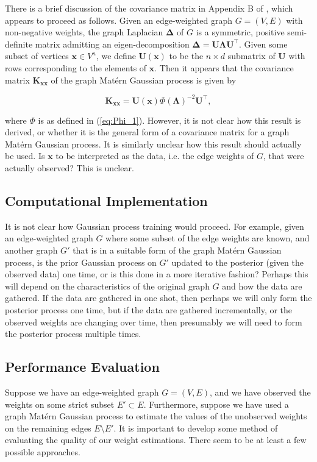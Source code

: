 There is a brief discussion of the covariance matrix in Appendix B of \cite{pmlr-v130-borovitskiy21a}, which appears to proceed as follows. Given an edge-weighted graph $G = (V, E)$ with non-negative weights, the graph Laplacian $\bm \Delta$ of $G$ is a symmetric, positive semi-definite matrix admitting an eigen-decomposition $\bm \Delta = \mathbf U \bm \Lambda \mathbf U^\intercal$. Given some subset of vertices $\bm x \in V^n$, we define $\mathbf U(\bm x)$ to be the $n \times d$ submatrix of $\mathbf U$ with rows corresponding to the elements of $\bm x$. Then it appears that the covariance matrix $\mathbf K_{\bm {xx}}$ of the graph Mat\'{e}rn Gaussian process is given by

\[
    \mathbf K_{\bm{xx}} = \mathbf U(\bm x)\Phi(\bm \Lambda)^{-2} \mathbf U^\intercal,
\]

where $\Phi$ is as defined in (\ref{eq:Phi_1}). However, it is not clear how this result is derived, or whether it is the general form of a covariance matrix for a graph Mat\'{e}rn Gaussian process. It is similarly unclear how this result should actually be used. Is $\bm x$ to be interpreted as the data, i.e. the edge weights of $G$, that were actually observed? This is unclear.

\subsection{Computational Implementation}\label{sec:comp_implem}

It is not clear how Gaussian process training would proceed. For example, given an edge-weighted graph $G$ where some subset of the edge weights are known, and another graph $G'$ that is in a suitable form of the graph Mat\'{e}rn Gaussian process, is the prior Gaussian process on $G'$ updated to the posterior (given the observed data) one time, or is this done in a more iterative fashion? Perhaps this will depend on the characteristics of the original graph $G$ and how the data are gathered. If the data are gathered in one shot, then perhaps we will only form the posterior process one time, but if the data are gathered incrementally, or the observed weights are changing over time, then presumably we will need to form the posterior process multiple times.

\subsection{Performance Evaluation}

Suppose we have an edge-weighted graph $G = (V, E)$, and we have observed the weights on some strict subset $E' \subset E$. Furthermore, suppose we have used a graph Mat\'{e}rn Gaussian process to estimate the values of the unobserved weights on the remaining edges $E \setminus E'$. It is important to develop some method of evaluating the quality of our weight estimations. There seem to be at least a few possible approaches.

